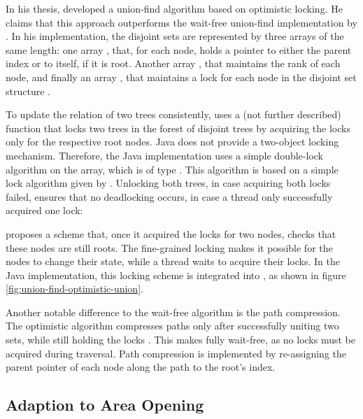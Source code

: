 In his thesis, \citet{Berman2010Multicore} developed a union-find algorithm
based on optimistic locking. He claims that this approach outperforms the
wait-free union-find implementation by \citet{Anderson1994Waitfree}. In his
implementation, the disjoint sets are represented by three arrays of the same
length: one array , that, for each node, holds a pointer to
either the parent index or to itself, if it is root. Another array
, that maintains the rank of each node, and finally an array
, that maintains a lock for each node in the disjoint set
structure \cite{Berman2010Multicore}.

To update the relation of two trees consistently, \citet{Berman2010Multicore}
uses a (not further described) function  that locks two
trees in the forest of disjoint trees by acquiring the locks only for the
respective root nodes. Java does not provide a two-object locking
mechanism. Therefore, the Java implementation uses a simple double-lock
algorithm on the  array, which is of type
. This algorithm is based on a simple lock algorithm
given by \citet{Herlihy2008Art}. Unlocking both trees, in case acquiring both
locks failed, ensures that no deadlocking occurs, in case a thread only
successfully acquired one lock:



\citet{Berman2010Multicore} proposes a scheme that, once it acquired the locks
for two nodes, checks that these nodes are still roots. The fine-grained locking
makes it possible for the nodes to change their state, while a thread waits to
acquire their locks. In the Java implementation, this locking scheme is
integrated into , as shown in figure
\ref{fig:union-find-optimistic-union}.

Another notable difference to the wait-free algorithm is the path
compression. The optimistic algorithm compresses paths only after successfully
uniting two sets, while still holding the locks \cite{Berman2010Multicore}. This
makes  fully wait-free, as no locks must be acquired during
traversal. Path compression is implemented by re-assigning the parent pointer of
each node along the path to the root's index.

\subsection{Adaption to Area Opening}
\label{sec:union-find-optimistic-adaption}

